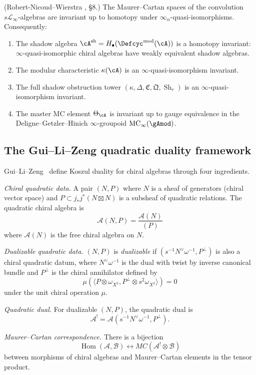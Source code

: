 \begin{corollary}
\label{cor:shadow-algebra-homotopy-invariant}%
%
\textup{(Robert-Nicoud--Wierstra \cite{RNW19}, \S8.)}
The Maurer--Cartan spaces of the convolution
$s\mathscr{L}_\infty$-algebras are invariant up to homotopy
under $\infty_\alpha$-quasi-isomorphisms. Consequently:
\begin{enumerate}[label=\textup{(\roman*)}]
\item The shadow algebra
 $\cA^{\mathrm{sh}} = H_\bullet(\Defcyc^{\mathrm{mod}}(\cA))$
 is a homotopy invariant:
 $\infty$-quasi-isomorphic chiral algebras have weakly
 equivalent shadow algebras.
\item The modular characteristic $\kappa(\cA)$ is an
 $\infty$-quasi-isomorphism invariant.
\item The full shadow obstruction tower
 $(\kappa, \Delta, \mathfrak{C}, \mathfrak{Q},
 \operatorname{Sh}_r)$ is an
 $\infty$-quasi-isomorphism invariant.
\item The master MC element $\Theta_\cA$ is invariant up to
 gauge equivalence in the
 Deligne--Getzler--Hinich $\infty$-groupoid
 $\mathrm{MC}_\infty(\gAmod)$.
\end{enumerate}
\end{corollary}

\subsection{The Gui--Li--Zeng quadratic duality framework}
\label{subsec:gui-li-zeng-framework}

\begin{definition}
\label{def:glz}
Gui--Li--Zeng~\cite{GLZ22} define Koszul duality for chiral algebras through four ingredients.

\emph{Chiral quadratic data.}
A pair $(N, P)$ where $N$ is a sheaf of generators (chiral vector space) and $P \subset j_* j^* (N \boxtimes N)$ is a subsheaf of quadratic relations.
The quadratic chiral algebra is
\[\mathcal{A}(N, P) = \frac{\mathcal{A}(N)}{(P)}\]
where $\mathcal{A}(N)$ is the free chiral algebra on $N$.

\emph{Dualizable quadratic data.}
$(N, P)$ is \emph{dualizable} if $(s^{-1}N^{\vee}\omega^{-1}, P^{\perp})$ is also a chiral
quadratic datum, where $N^{\vee}\omega^{-1}$ is the dual with twist by inverse canonical bundle and $P^{\perp}$ is the chiral annihilator defined by
\[\mu(\langle P \otimes \omega_{X^2}, P^{\perp} \otimes s^2\omega_{X^2}\rangle) = 0\]
under the unit chiral operation $\mu$.

\emph{Quadratic dual.}
For dualizable $(N, P)$, the quadratic dual is
\[\mathcal{A}^! = \mathcal{A}(s^{-1}N^{\vee}\omega^{-1}, P^{\perp}).\]

\emph{Maurer--Cartan correspondence.}
There is a bijection
\[\operatorname{Hom}(\mathcal{A}, \mathcal{B}) \leftrightarrow MC(\mathcal{A}^! \otimes \mathcal{B})\]
between morphisms of chiral algebras and Maurer--Cartan elements in the tensor product.
\end{definition}


